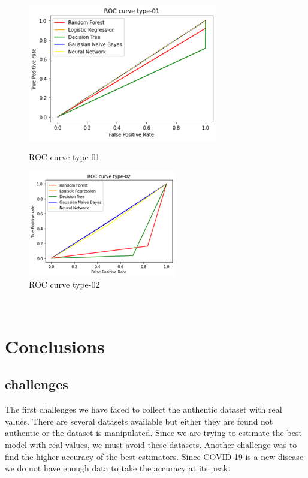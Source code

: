 \documentclass[letterpaper,11pt]{article}
\begin{document}
\\
\begin{figure}[htp]
    \centering
    \begin{minipage}[b]{.40\textwidth}
        \includegraphics[width=8cm\textwidth]{ROC1.png}
        \caption{ROC curve type-01}
        \label{fig:ROC1}
    \end{minipage}
    \begin{minipage}[b]{.40\textwidth}
        \includegraphics[width=8cm\textwidth]{roc2.png}
        \caption{ROC curve type-02}
        \label{fig:ROC2}
    \end{minipage}
\end{figure}



\\

\section{Conclusions}
\subsection{challenges}
The first challenges we have faced to collect the authentic dataset with real values. There are several datasets available but either they are found not authentic or the dataset is manipulated. Since we are trying to estimate the best model with real values, we must avoid these datasets. Another challenge was to find the higher accuracy of the best estimators. Since COVID-19 is a new disease we do not have enough data to take the accuracy at its peak.  \\
\\
\end{document}

